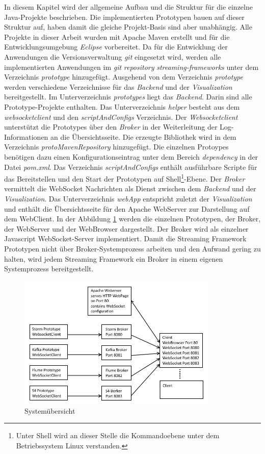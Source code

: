 In diesem Kapitel wird der allgemeine Aufbau und die Struktur für die einzelne Java-Projekte beschrieben. Die implementierten Prototypen bauen auf dieser Struktur auf, haben damit die gleiche Projekt-Basis sind aber unabhängig. Alle Projekte in dieser Arbeit wurden mit Apache Maven erstellt und für die Entwicklungsumgebung \textit{Eclipse} vorbereitet. Da für die Entwicklung der Anwendungen die Versionsverwaltung \textit{git} eingesetzt wird, werden alle implementierten Anwendungen im \textit{git} \textit{repository} \textit{streaming-frameworks} unter dem Verzeichnis \textit{prototype} hinzugefügt. Ausgehend von dem Verzeichnis \textit{prototype} werden verschiedene Verzeichnisse für das \textit{Backend} und der \textit{Visualization} bereitgestellt. Im Unterverzeichnis \textit{prototypes} liegt das \textit{Backend}. Darin sind alle Prototype-Projekte enthalten. Das Unterverzeichnis \textit{helper} besteht aus dem \textit{websocketclient} und den \textit{scriptAndConfigs} Verzeichnis. Der \textit{Websocketclient} unterstützt die Prototypes über den \textit{Broker} in der Weiterleitung der Log-Informationen an die Übersichtsseite. Die erzeugte Bibliothek wird in dem Verzeichnis \textit{protoMavenRepository} hinzugefügt. Die einzelnen Protoypes benötigen dazu einen Konfigurationseintrag unter dem Bereich \textit{dependency} in der Datei \textit{pom.xml}. Das Verzeichnis \textit{scriptAndConfigs} enthält ausführbare Scripte für das Bereitstellen und den Start der Prototypen auf Shell\footnote{Unter Shell wird an dieser Stelle die Kommandoebene unter dem Betriebssystem Linux verstanden.}-Ebene. Der \textit{Broker} vermittelt die WebSocket Nachrichten als Dienst zwischen dem \textit{Backend} und der \textit{Visualization}. Das Unterverzeichnis \textit{webApp} entspricht zuletzt der \textit{Visualization} und enthält die Übersichtsseite für den Apache WebServer zur Darstellung auf dem WebClient. In der Abbildung \ref{fig:systemOverview} werden die einzelnen Prototypen, der Broker, der WebServer und der WebBrowser dargestellt. Der Broker wird als einzelner Javascript WebSocket-Server implementiert. Damit die Streaming Framework Prototypen nicht über Broker-Systemprozess arbeiten und den Aufwand gering zu halten, wird jedem Streaming Framework ein Broker in einem eigenen Systemprozess bereitgestellt.

\begin{figure}[htb!]
\centering
\includegraphics[width=0.85\textwidth]{bilder/SystemOverview.png}
\caption{Systemübersicht
\label{fig:systemOverview}}
\end{figure}


